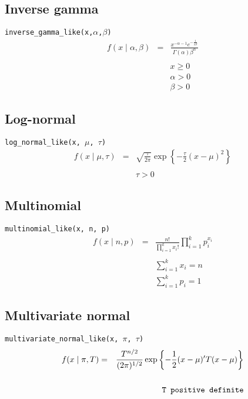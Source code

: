 \subsection*{Inverse gamma}
\verb=inverse_gamma_like(x,=$\alpha$\verb=,=$\beta$\verb=)=
\begin{eqnarray*}
f(x \mid \alpha, \beta) &=& \frac{x^{-\alpha - 1} e^{-\frac{1}{x\beta}}}{\Gamma(\alpha)\beta^\alpha} \\
\\
&& x \ge 0 \\
&& \alpha > 0 \\
&& \beta > 0
\end{eqnarray*}

\subsection*{Log-normal}
\verb=log_normal_like(x, =$\mu$\verb=, =$\tau$\verb=)=
\begin{eqnarray*}
f(x \mid \mu, \tau) &=& \sqrt{\frac{\tau}{2\pi}} \exp\left\{ -\frac{\tau}{2} (x-\mu)^2 \right\}\\
\\
&& \tau > 0
\end{eqnarray*}

\subsection*{Multinomial}
\verb=multinomial_like(x, n, p)=
\begin{eqnarray*}
f(x \mid n, p) &=& \frac{n!}{\prod_{i=1}^k x_i!} \prod_{i=1}^k p_i^{x_i}\\
\\
&& \sum_{i=1}^k x_i=n \\
&& \sum_{i=1}^k p_i=1
\end{eqnarray*}

\subsection*{Multivariate normal}
\verb=multivariate_normal_like(x, =$\pi$\verb=, =$\tau$\verb=)=
\begin{eqnarray*}
f(x \mid \pi, T) &=& \frac{T^{n/2}}{(2\pi)^{1/2}} \exp\left\{ -\frac{1}{2} (x-\mu)^{\prime}T(x-\mu) \right\}\\
\\
&& \verb=T positive definite=
\end{eqnarray*}


